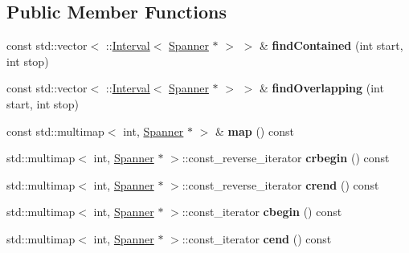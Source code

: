\subsection*{Public Member Functions}
\begin{DoxyCompactItemize}
\item 
\mbox{\label{class_ms_1_1_spanner_map_ab8b3f3e3eac2902443407868a52f9654}} 
const std\+::vector$<$ \+::\hyperlink{struct_ms_1_1_interval}{Interval}$<$ \hyperlink{class_ms_1_1_spanner}{Spanner} $\ast$ $>$ $>$ \& {\bfseries find\+Contained} (int start, int stop)
\item 
\mbox{\label{class_ms_1_1_spanner_map_a50d0c4abc63052ad825a4c48cc72dbd3}} 
const std\+::vector$<$ \+::\hyperlink{struct_ms_1_1_interval}{Interval}$<$ \hyperlink{class_ms_1_1_spanner}{Spanner} $\ast$ $>$ $>$ \& {\bfseries find\+Overlapping} (int start, int stop)
\item 
\mbox{\label{class_ms_1_1_spanner_map_ac9235e97b420aacd2f79612684403cd7}} 
const std\+::multimap$<$ int, \hyperlink{class_ms_1_1_spanner}{Spanner} $\ast$ $>$ \& {\bfseries map} () const
\item 
\mbox{\label{class_ms_1_1_spanner_map_a84da5c7bb6f29b5998a05737916a4566}} 
std\+::multimap$<$ int, \hyperlink{class_ms_1_1_spanner}{Spanner} $\ast$ $>$\+::const\+\_\+reverse\+\_\+iterator {\bfseries crbegin} () const
\item 
\mbox{\label{class_ms_1_1_spanner_map_abc59d7e340d6a17c7be44c03ad9a6712}} 
std\+::multimap$<$ int, \hyperlink{class_ms_1_1_spanner}{Spanner} $\ast$ $>$\+::const\+\_\+reverse\+\_\+iterator {\bfseries crend} () const
\item 
\mbox{\label{class_ms_1_1_spanner_map_aaacc8f25d4acd07f477ee4996c9b32dd}} 
std\+::multimap$<$ int, \hyperlink{class_ms_1_1_spanner}{Spanner} $\ast$ $>$\+::const\+\_\+iterator {\bfseries cbegin} () const
\item 
\mbox{\label{class_ms_1_1_spanner_map_aca6d9a30e6c52c250e61395a4356d345}} 
std\+::multimap$<$ int, \hyperlink{class_ms_1_1_spanner}{Spanner} $\ast$ $>$\+::const\+\_\+iterator {\bfseries cend} () const

\end{DoxyCompactItemize}
